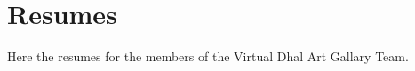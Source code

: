 


\section{Resumes}


Here the resumes for the members of the Virtual Dhal Art Gallary Team.

     
     
%     



% 


% 




